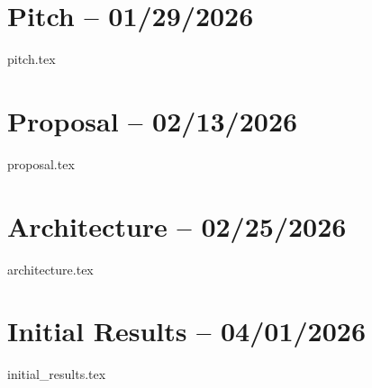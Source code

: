 {\raggedright

\section*{\Centering Pitch -- \footnotesize 01/29/2026}
 \vspace{2ex}
{pitch.tex}

\feedbackdividerfancy

\section*{\Centering Proposal -- \footnotesize 02/13/2026}
 \vspace{2ex}
{proposal.tex}

\feedbackdividerfancy

\section*{Architecture -- \footnotesize 02/25/2026}
 \vspace{2ex}
{architecture.tex}

\feedbackdividerfancy

\section*{Initial Results -- \footnotesize 04/01/2026}
 \vspace{2ex}
{initial_results.tex}

\feedbackdividerfancy

}

